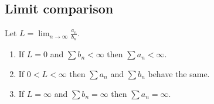 \documentclass[12pt]{article}
\begin{document}
\begin{multicols}{2}
\subsection*{Limit comparison}
Let $L = \lim_{n\to\infty} \frac{a_n}{b_n}$.
\begin{enumerate}
    \item If $L=0$ and $\sum b_n < \infty$ then $\sum a_n < \infty$.
    \item If $0<L<\infty$ then $\sum a_n$ and $\sum b_n$ behave the same.
    \item If $L=\infty$ and $\sum b_n = \infty$ then $\sum a_n = \infty$.
\end{enumerate}

\end{multicols}
\end{document}

